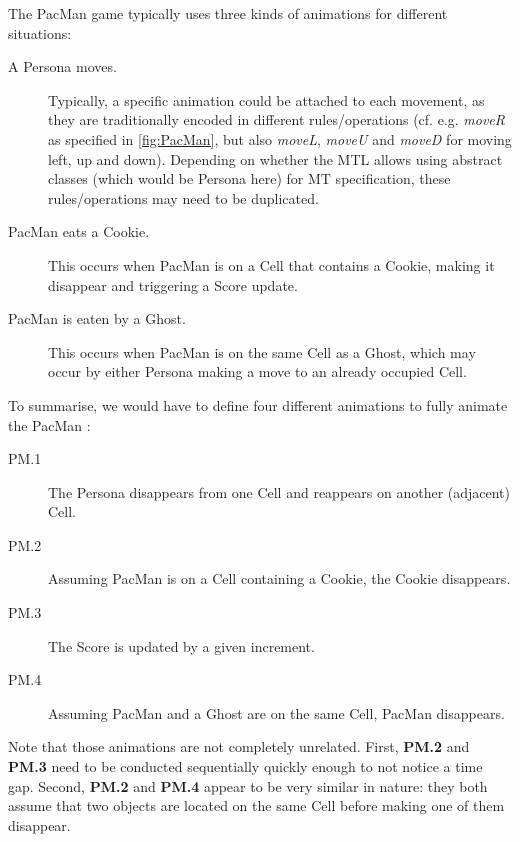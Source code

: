 The PacMan game typically uses three kinds of animations for different situations:
\begin{description}
   \item[A \textsf{Persona} moves.] Typically, a specific animation could be attached
   to each movement, as they are traditionally encoded in different rules/operations
   (cf. e.g. \textsl{moveR} as specified in \autoref{fig:PacMan}, but also 
   \textsl{moveL}, \textsl{moveU} and \textsl{moveD} for moving left, up and down).
   Depending on whether the MTL allows using abstract classes (which would be 
   \textsf{Persona} here) for MT specification, these rules/operations may need 
   to be duplicated. 
   
   \item[\textsf{PacMan} eats a \textsf{Cookie}.] This occurs when \textsf{PacMan} is on a \textsf{Cell}
   that contains a \textsf{Cookie}, making it disappear and triggering a 
   \textsf{Score} update.
   
   \item[\textsf{PacMan} is eaten by a \textsf{Ghost}.] This occurs when 
   \textsf{PacMan} is on the same \textsf{Cell} as a \textsf{Ghost}, which may occur
   by either \textsf{Persona} making a move to an already occupied \textsf{Cell}.
\end{description}
To summarise, we would have to define four different animations to fully animate
the \textsf{PacMan} \DSL:
\begin{description}
   \item[PM.1] The \textsf{Persona} disappears from one \textsf{Cell} and reappears
   on another (adjacent) \textsf{Cell}.
   
   \item[PM.2] Assuming \textsf{PacMan} is on a \textsf{Cell} containing a \textsf{Cookie},
   the \textsf{Cookie} disappears.
   
   \item[PM.3] The \textsf{Score} is updated by a given increment. 

   \item[PM.4] Assuming \textsf{PacMan} and a \textsf{Ghost} are on the same
   \textsf{Cell}, \textsf{PacMan} disappears.
\end{description}
Note that those animations are not completely unrelated. First, \textbf{PM.2} and
\textbf{PM.3} need to be conducted sequentially quickly enough to not notice a
time gap. Second, \textbf{PM.2} and \textbf{PM.4} appear to be very similar in
nature: they both assume that two objects are located on the same \textsf{Cell} 
before making one of them disappear.

